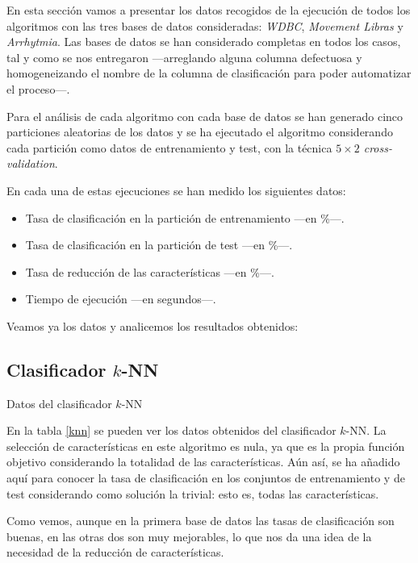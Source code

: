 \documentclass[a4paper, 11pt, titlepage]{article}
\begin{document}
    En esta sección vamos a presentar los datos recogidos de la ejecución de todos los algoritmos con las tres bases de datos consideradas: \emph{WDBC}, \emph{Movement Libras} y \emph{Arrhytmia}. Las bases de datos se han considerado completas en todos los casos, tal y como se nos entregaron ---arreglando alguna columna defectuosa y homogeneizando el nombre de la columna de clasificación para poder automatizar el proceso---.

    Para el análisis de cada algoritmo con cada base de datos se han generado cinco particiones aleatorias de los datos y se ha ejecutado el algoritmo considerando cada partición como datos de entrenamiento y test, con la técnica \emph{$5\times2$ cross-validation}.

    En cada una de estas ejecuciones se han medido los siguientes datos:
    \begin{itemize}
        \item Tasa de clasificación en la partición de entrenamiento ---en \%---.
        \item Tasa de clasificación en la partición de test ---en \%---.
        \item Tasa de reducción de las características ---en \%---.
        \item Tiempo de ejecución ---en segundos---.
    \end{itemize}

    Veamos ya los datos y analicemos los resultados obtenidos:

    \subsection{Clasificador $k$-NN}
    \begin{table}[!htb]
        \maketable{\dataKNN}
        \caption{Datos del clasificador $k$-NN}
        \label{knn}
    \end{table}

    En la tabla \ref{knn} se pueden ver los datos obtenidos del clasificador $k$-NN. La selección de características en este algoritmo es nula, ya que es la propia función objetivo considerando la totalidad de las características. Aún así, se ha añadido aquí para conocer la tasa de clasificación en los conjuntos de entrenamiento y de test considerando como solución la trivial: esto es, todas las características.

    Como vemos, aunque en la primera base de datos las tasas de clasificación son buenas, en las otras dos son muy mejorables, lo que nos da una idea de la necesidad de la reducción de características.
\end{document}
